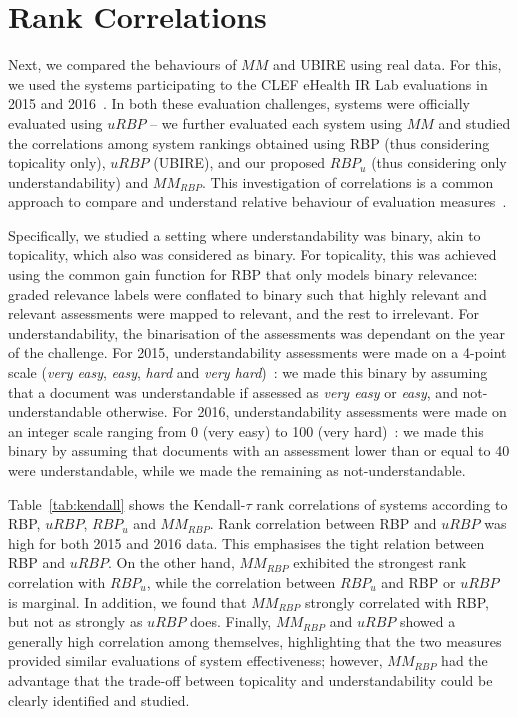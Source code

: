 



\section{Rank Correlations} %
\label{sec:clef}
Next, we compared the behaviours of $MM$ and UBIRE using real data. For this, we used the systems participating to the CLEF eHealth IR Lab evaluations in 2015 and 2016~\cite{clefIR15,clefIR16}. In both these evaluation challenges, systems were officially evaluated using $uRBP$ -- we further evaluated each system using $MM$ and studied the correlations among system rankings obtained using RBP (thus considering topicality only), $uRBP$ (UBIRE), and our proposed $RBP_u$ (thus considering only understandability) and $MM_{RBP}$. This investigation of correlations is a common approach to compare and understand relative behaviour of evaluation measures~\cite{zuccon16}. 

Specifically, we studied a setting where understandability was binary, akin to topicality, which also was considered as binary. For topicality, this was achieved using the common gain function for RBP that only models binary relevance: graded relevance labels were conflated to binary such that highly relevant and relevant assessments were mapped to relevant, and the rest to irrelevant. For understandability, the binarisation of the assessments was dependant on the year of the challenge. For 2015, understandability assessments were made on a 4-point scale (\textit{very easy}, \textit{easy}, \textit{hard} and \textit{very hard})~\cite{clefIR15}: we made this binary by assuming that a document was understandable if assessed as \textit{very easy} or \textit{easy}, and not-understandable otherwise. For 2016, understandability assessments were made on an integer scale ranging from 0 (very easy) to 100 (very hard)~\cite{clefIR16}: we made this binary by assuming that documents with an assessment lower than or equal to 40 were understandable, while we made the remaining as not-understandable. 

Table~\ref{tab:kendall} shows the Kendall-$\tau$ rank correlations of systems according to RBP, $uRBP$, $RBP_u$ and $MM_{RBP}$. Rank correlation between RBP and $uRBP$ was high for both 2015 and 2016 data. This emphasises the tight relation between RBP and $uRBP$. On the other hand, $MM_{RBP}$ exhibited the strongest rank correlation with $RBP_u$, while the correlation between $RBP_u$ and RBP or $uRBP$ is marginal. In addition, we found that $MM_{RBP}$ strongly correlated with RBP, but not as strongly as  $uRBP$ does. Finally, $MM_{RBP}$ and $uRBP$ showed a generally high correlation among themselves, highlighting that the two measures provided similar evaluations of system effectiveness; however, $MM_{RBP}$ had the advantage that the trade-off between topicality and understandability could be clearly identified and studied. 

